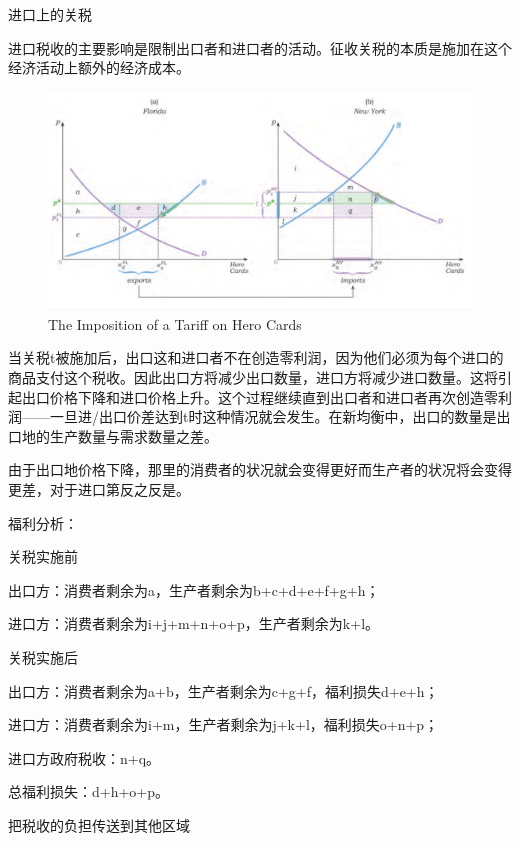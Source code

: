 \documentclass{article}
\begin{document}
进口上的关税

进口税收的主要影响是限制出口者和进口者的活动。征收关税的本质是施加在这个经济活动上额外的经济成本。

\begin{figure}[H] %
	\centering %
	\includegraphics[width=1\textwidth]{20_3} %
	\caption{The Imposition of a Tariff on Hero Cards} %
	\label{Fig.main4} %
\end{figure}

当关税t被施加后，出口这和进口者不在创造零利润，因为他们必须为每个进口的商品支付这个税收。因此出口方将减少出口数量，进口方将减少进口数量。这将引起出口价格下降和进口价格上升。这个过程继续直到出口者和进口者再次创造零利润——一旦进/出口价差达到t时这种情况就会发生。在新均衡中，出口的数量是出口地的生产数量与需求数量之差。

由于出口地价格下降，那里的消费者的状况就会变得更好而生产者的状况将会变得更差，对于进口第反之反是。

福利分析：

关税实施前

出口方：消费者剩余为a，生产者剩余为b+c+d+e+f+g+h；

进口方：消费者剩余为i+j+m+n+o+p，生产者剩余为k+l。

关税实施后

出口方：消费者剩余为a+b，生产者剩余为c+g+f，福利损失d+e+h；

进口方：消费者剩余为i+m，生产者剩余为j+k+l，福利损失o+n+p；

进口方政府税收：n+q。

总福利损失：d+h+o+p。

\hspace*{\fill}

把税收的负担传送到其他区域
\end{document}
